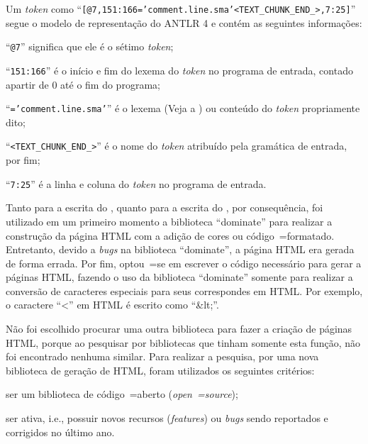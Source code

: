 Um \textit{token} como ``\texttt{[@7,151:166='comment.line.sma'<TEXT_CHUNK_END_>,7:25]}'' segue o modelo de representação do ANTLR 4 \cite{antlrBookTerrentParr} e
contém as seguintes informações:
\begin{inparaenum}[1)]
\item ``\texttt{@7}'' significa que ele é o sétimo \textit{token};
\item ``\texttt{151:166}'' é o início e
fim do lexema do \textit{token} no programa de entrada,
contado apartir de 0 até o fim do programa;
\item ``\texttt{='comment.line.sma'}'' é o lexema (Veja a ) ou
conteúdo do \textit{token} propriamente dito;
\item ``\texttt{<TEXT_CHUNK_END_>}'' é o nome do \textit{token} atribuído pela gramática de entrada,
por fim;
\item ``\texttt{7:25}'' é a linha e
coluna do \textit{token} no programa de entrada.
\end{inparaenum}%

Tanto para a escrita do ,
quanto para a escrita do ,
por consequência,
foi utilizado em um primeiro momento a biblioteca ``dominate'' para realizar a construção da página HTML com a adição de cores ou
código~=formatado. Entretanto,
devido a \textit{bugs} na biblioteca ``dominate'',
a página HTML era gerada de forma errada.
Por fim,
optou~=se em escrever o código necessário para gerar a páginas HTML,
fazendo o uso da biblioteca ``dominate'' somente para realizar a conversão de caracteres especiais para seus correspondes em HTML.
Por exemplo,
o caractere ``<'' em HTML é escrito como ``\&lt;''.

Não foi escolhido procurar uma outra biblioteca para fazer a criação de páginas HTML,
porque ao pesquisar por bibliotecas que tinham somente esta função,
não foi encontrado nenhuma similar.
Para realizar a pesquisa,
por uma nova biblioteca de geração de HTML,
foram utilizados os seguintes critérios:
\begin{inparaenum}[1)]
\item ser um biblioteca de código~=aberto (\textit{open~=source});
\item ser ativa,
i.e.,
possuir novos recursos (\textit{features}) ou
\textit{bugs} sendo reportados e
corrigidos no último ano.
\end{inparaenum}%

